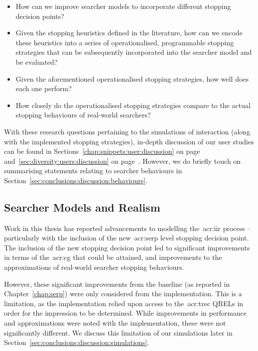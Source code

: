 \begin{itemize}
    \item{ How can we improve searcher models to incorporate different stopping decision points?}
    \item{ Given the stopping heuristics defined in the literature, how can we encode these heuristics into a series of operationalised, programmable stopping strategies that can be subsequently incorporated into the searcher model and be evaluated?}
    \item{ Given the aforementioned operationalised stopping strategies, how well does each one perform?}
    \item{ How closely do the operationalised stopping strategies compare to the actual stopping behaviours of real-world searchers?}
\end{itemize}

With these research questions pertaining to the simulations of interaction (along with the implemented stopping strategies), in-depth discussion of our user studies can be found in Sections~\ref{chap:snippets:user:discussion} on page~\pageref{chap:snippets:user:discussion} and~\ref{sec:diversity:users:discussion} on page~\pageref{sec:diversity:users:discussion}. However, we do briefly touch on summarising statements relating to searcher behaviours in Section~\ref{sec:conclusions:discussion:behaviours}.

\subsection{Searcher Models and Realism}\label{sec:conclusions:discussion:realism}
Work in this thesis has reported advancements to modelling the~\gls{acr:iir} process -- particularly with the inclusion of the new~\gls{acr:serp} level stopping decision point. The inclusion of the new stopping decision point led to significant improvements in terms of the~\gls{acr:cg} that could be attained, and improvements to the approximations of real-world searcher stopping behaviours.

However, these significant improvements from the  baseline (as reported in Chapter~\ref{chap:serp}) were only considered from the  implementation. This is a limitation, as the implementation relied upon access to the~\gls{acr:trec} QRELs in order for the impression to be determined. While improvements in performance and approximations were noted with the  implementation, these were not significantly different. We discuss this limitation of our simulations later in Section~\ref{sec:conclusions:discussion:simulations}.

